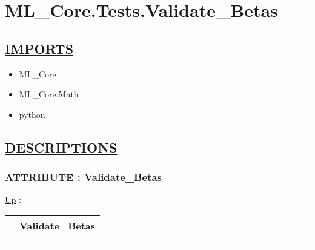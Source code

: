 \chapter*{ML\_Core.Tests.Validate\_Betas}
\hypertarget{ecldoc:toc:ML_Core.Tests.Validate_Betas}{}

\section*{\underline{IMPORTS}}
\begin{itemize}
\item ML\_Core
\item ML\_Core.Math
\item python
\end{itemize}

\section*{\underline{DESCRIPTIONS}}
\subsection*{ATTRIBUTE : Validate\_Betas}
\hypertarget{ecldoc:ml_core.tests.validate_betas}{}
\hyperlink{ecldoc:toc:ML_Core/Tests}{Up} :

{\renewcommand{\arraystretch}{1.5}
\begin{tabularx}{\textwidth}{|>{\raggedright\arraybackslash}l|X|}
\hline
\hspace{0pt} & Validate\_Betas \\
\hline
\end{tabularx}
}

\par


\rule{\linewidth}{0.5pt}
